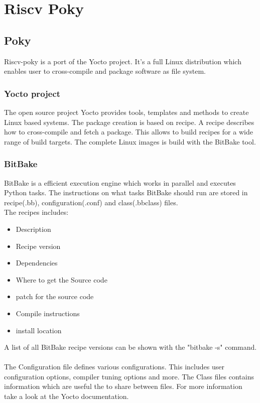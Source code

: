 
\chapter{Riscv Poky}

\section{Poky}

Riscv-poky is a port of the Yocto project. It's a full Linux distribution which enables user to 
cross-compile and package software as file system.

\subsection{Yocto project}

The open source project Yocto provides tools, templates and methods to create Linux based systems. 
The package creation is based on recipe. A recipe describes how to cross-compile and fetch a package.
This allows to build recipes for a wide range of build targets. The complete Linux images is build with
the BitBake tool.

\subsection{BitBake}

BitBake is a efficient execution engine which works in parallel and executes Python tasks.
The instructions on what tasks BitBake should run are stored in recipe(.bb), configuration(.conf) and 
class(.bbclass) files.
\\
The recipes includes:
\begin{itemize}
\item Description
\item Recipe version
\item Dependencies
\item Where to get the Source code
\item patch for the source code
\item Compile instructions
\item install location
\end{itemize}
A list of all BitBake recipe versions can be shown with the "bitbake -s" command.
\\ \\
The Configuration file defines various configurations. This includes user configuration options, 
compiler tuning options and more. The Class files contains information which are useful the to 
share between files. For more information take a look at the Yocto documentation.

